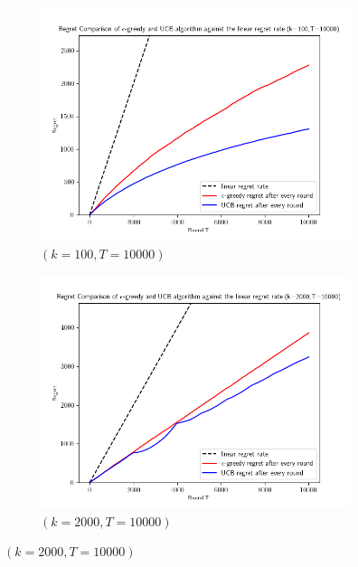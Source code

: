 \documentclass[12pt]{article}
\begin{document}
\begin{enumerate}
			\begin{figure}[h!]
				\centering
				\begin{subfigure}[b]{0.3\textwidth}
					\centering
					\includegraphics[width=\textwidth]{fig5.png}
					\caption{$(k=100, T=10000)$}
				\end{subfigure}
				\hfill
				\begin{subfigure}[b]{0.3\textwidth}
					\centering
					\includegraphics[width=\textwidth]{fig6.png}
					\caption{$(k=2000, T=10000)$}
				\end{subfigure}
				

\end{figure}
\end{enumerate}
\end{document}
